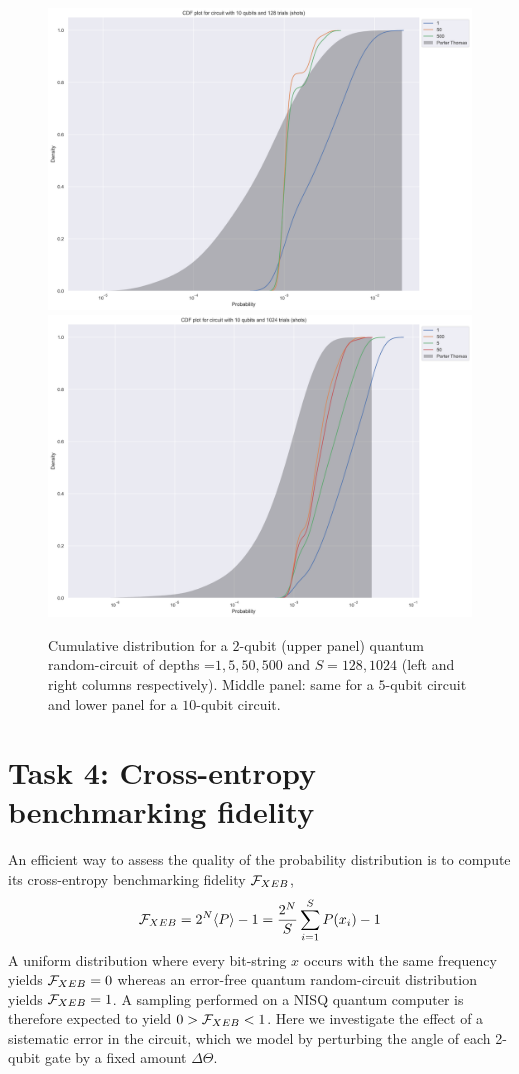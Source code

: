 \documentclass{article}
\begin{document}
\begin{figure}[p]
  \vspace{3cm}

  \includegraphics[width=.4\textwidth]{CDF plot for circuit with 10 qubits and 128 trials (shots)}
  \hspace{1cm}
  \includegraphics[width=.4\textwidth]{CDF plot for circuit with 10 qubits and 1024 trials (shots)}

  \caption{Cumulative distribution for a $2$-qubit (upper panel) quantum random-circuit of depths =$1,5,50,500$ and $S=128,1024$ (left and right columns respectively). Middle panel: same for a $5$-qubit circuit and lower panel for a $10$-qubit circuit.}
  \label{fig:PT}
\end{figure}

\section{Task 4: Cross-entropy benchmarking fidelity}
An efficient way to assess the quality  of the probability distribution is to compute its 
cross-entropy benchmarking fidelity ${\cal F}_{XEB}$,
\begin{equation}
    {\cal F}_{XEB}=2^N\langle P \rangle -1=\frac{2^N}{S}\sum_{i=1}^SP(x_i) -1
\end{equation}
A uniform distribution where every bit-string $x$ occurs with the same frequency yields ${\cal F}_{XEB}=0$ whereas an error-free quantum random-circuit distribution yields ${\cal F}_{XEB}=1$. A sampling performed on a NISQ quantum computer is therefore expected to yield $0>{\cal F}_{XEB}<1$.
Here we investigate the effect of a sistematic error in the circuit, which we model by perturbing the angle of each 2-qubit gate by a fixed amount $\Delta \Theta$.
{\it}
\end{document}

